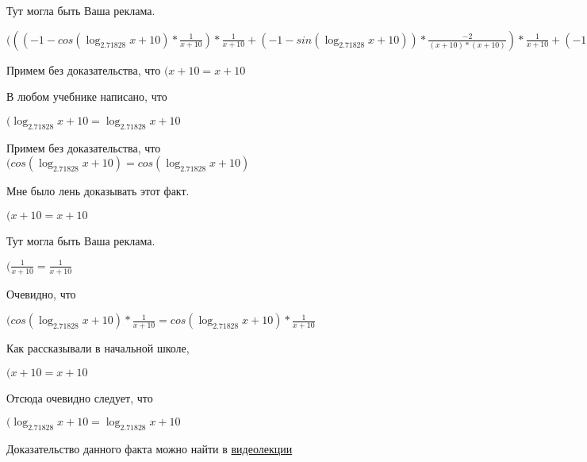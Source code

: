 \documentclass[12pt,a4paper,fleqn]{article}
\theoremstyle{definition}
\begin{document}
Тут могла быть Ваша реклама.

$((( -1  - cos(\log_{ 2.71828 }{ x  +  10 }) * \frac{ 1 }{ x  +  10 }
) * \frac{ 1 }{ x  +  10 }
 + ( -1  - sin(\log_{ 2.71828 }{ x  +  10 })) * \frac{ -2 }{( x  +  10 ) * ( x  +  10 )}
) * \frac{ 1 }{ x  +  10 }
 + ( -1  - sin(\log_{ 2.71828 }{ x  +  10 })) * \frac{ 1 }{ x  +  10 }
 * \frac{ -2 }{( x  +  10 ) * ( x  +  10 )}
 + ( -1  - sin(\log_{ 2.71828 }{ x  +  10 })) * \frac{ 1 }{ x  +  10 }
 * \frac{ -2 }{( x  +  10 ) * ( x  +  10 )}
 + cos(\log_{ 2.71828 }{ x  +  10 }) * \frac{ -1  -  -2  * ( x  +  10  +  x  +  10 )}{( x  +  10 ) * ( x  +  10 ) * ( x  +  10 ) * ( x  +  10 )}
 = (( -1  - cos(\log_{ 2.71828 }{ x  +  10 }) * \frac{ 1 }{ x  +  10 }
) * \frac{ 1 }{ x  +  10 }
 + ( -1  - sin(\log_{ 2.71828 }{ x  +  10 })) * \frac{ -2 }{( x  +  10 ) * ( x  +  10 )}
) * \frac{ 1 }{ x  +  10 }
 + ( -1  - sin(\log_{ 2.71828 }{ x  +  10 })) * \frac{ 1 }{ x  +  10 }
 * \frac{ -2 }{( x  +  10 ) * ( x  +  10 )}
 + ( -1  - sin(\log_{ 2.71828 }{ x  +  10 })) * \frac{ 1 }{ x  +  10 }
 * \frac{ -2 }{( x  +  10 ) * ( x  +  10 )}
 + cos(\log_{ 2.71828 }{ x  +  10 }) * \frac{ -1  -  -2  * ( x  +  10  +  x  +  10 )}{( x  +  10 ) * ( x  +  10 ) * ( x  +  10 ) * ( x  +  10 )}
$

Примем без доказательства, что
$( x  +  10  =  x  +  10 $

В любом учебнике написано, что

$(\log_{ 2.71828 }{ x  +  10 } = \log_{ 2.71828 }{ x  +  10 }$

Примем без доказательства, что
$(cos(\log_{ 2.71828 }{ x  +  10 }) = cos(\log_{ 2.71828 }{ x  +  10 })$

Мне было лень доказывать этот факт.

$( x  +  10  =  x  +  10 $

Тут могла быть Ваша реклама.

$(\frac{ 1 }{ x  +  10 }
 = \frac{ 1 }{ x  +  10 }
$

Очевидно, что

$(cos(\log_{ 2.71828 }{ x  +  10 }) * \frac{ 1 }{ x  +  10 }
 = cos(\log_{ 2.71828 }{ x  +  10 }) * \frac{ 1 }{ x  +  10 }
$

Как рассказывали в начальной школе,

$( x  +  10  =  x  +  10 $

Отсюда очевидно следует, что

$(\log_{ 2.71828 }{ x  +  10 } = \log_{ 2.71828 }{ x  +  10 }$

Доказательство данного факта можно найти в \href{https://www.youtube.com/watch?v=dQw4w9WgXcQ}{видеолекции}
\end{document}
